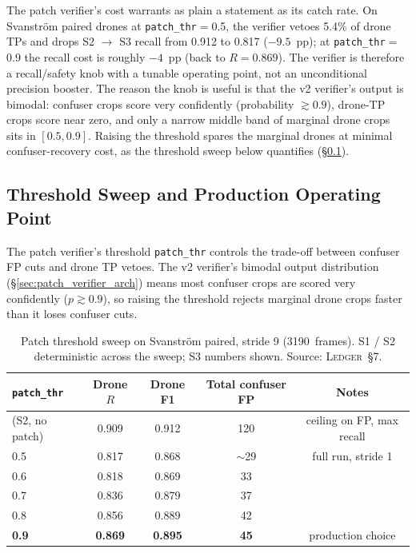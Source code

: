 \documentclass[12pt,a4paper,oneside,openright]{book}
\begin{document}
The patch verifier's cost warrants as plain a statement as its catch rate. On Svanstr\"om paired drones at \texttt{patch\_thr}$=$0.5, the verifier vetoes 5.4\% of drone TPs and drops S2 $\to$ S3 recall from 0.912 to 0.817 ($-9.5$~pp); at \texttt{patch\_thr}$=$0.9 the recall cost is roughly $-4$~pp (back to $R=0.869$). The verifier is therefore a recall/safety knob with a tunable operating point, not an unconditional precision booster. The reason the knob is useful is that the v2 verifier's output is bimodal: confuser crops score very confidently (probability $\gtrsim 0.9$), drone-TP crops score near zero, and only a narrow middle band of marginal drone crops sits in $[0.5, 0.9]$. Raising the threshold spares the marginal drones at minimal confuser-recovery cost, as the threshold sweep below quantifies (\S\ref{sec:patch_threshold}).

\subsection{Threshold Sweep and Production Operating Point}
\label{sec:patch_threshold}

The patch verifier's threshold \texttt{patch\_thr} controls the trade-off between confuser FP cuts and drone TP vetoes. The v2 verifier's bimodal output distribution (\S\ref{sec:patch_verifier_arch}) means most confuser crops are scored very confidently ($p \gtrsim 0.9$), so raising the threshold rejects marginal drone crops faster than it loses confuser cuts.

\begin{table}[htbp]
    \centering
    \caption{Patch threshold sweep on Svanstr\"om paired, stride 9 (3190~frames). S1 / S2 deterministic across the sweep; S3 numbers shown. Source: \textsc{Ledger}~\S7.}
    \label{tab:patch_sweep}
    \begin{tabular}{lcccc}
        \toprule
        \texttt{patch\_thr} & Drone $R$ & Drone F1 & Total confuser FP & Notes \\
        \midrule
        (S2, no patch) & 0.909 & 0.912 & 120 & ceiling on FP, max recall \\
        0.5 & 0.817 & 0.868 & $\sim$29 & full run, stride 1 \\
        0.6 & 0.818 & 0.869 & 33 & \\
        0.7 & 0.836 & 0.879 & 37 & \\
        0.8 & 0.856 & 0.889 & 42 & \\
        \textbf{0.9} & \textbf{0.869} & \textbf{0.895} & \textbf{45} & production choice \\
        \bottomrule
    \end{tabular}
\end{table}
\end{document}
